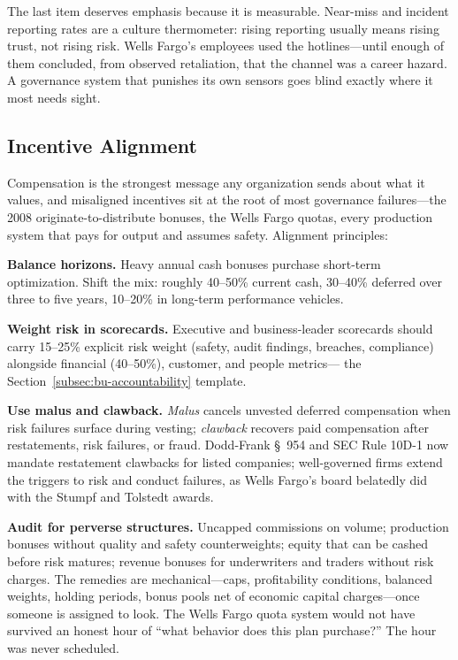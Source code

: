 \documentclass[11pt,openany]{book}
\begin{document}
The last item deserves emphasis because it is measurable. Near-miss and
incident reporting rates are a culture thermometer: rising reporting usually
means rising trust, not rising risk. Wells Fargo's employees used the
hotlines---until enough of them concluded, from observed retaliation, that
the channel was a career hazard. A governance system that punishes its own
sensors goes blind exactly where it most needs sight.

\subsection{Incentive Alignment}
\label{subsec:gov-incentives}

Compensation is the strongest message any organization sends about what it
values, and misaligned incentives sit at the root of most governance
failures---the 2008 originate-to-distribute bonuses, the Wells Fargo quotas,
every production system that pays for output and assumes safety. Alignment
principles:

\textbf{Balance horizons.} Heavy annual cash bonuses purchase short-term
optimization. Shift the mix: roughly 40--50\% current cash, 30--40\% deferred
over three to five years, 10--20\% in long-term performance vehicles.

\textbf{Weight risk in scorecards.} Executive and business-leader scorecards
should carry 15--25\% explicit risk weight (safety, audit findings, breaches,
compliance) alongside financial (40--50\%), customer, and people metrics---%
the Section~\ref{subsec:bu-accountability} template.

\textbf{Use malus and clawback.} \emph{Malus} cancels unvested deferred
compensation when risk failures surface during vesting; \emph{clawback}
recovers paid compensation after restatements, risk failures, or fraud.
Dodd-Frank \S~954 and SEC Rule 10D-1 now mandate restatement clawbacks for
listed companies; well-governed firms extend the triggers to risk and conduct
failures, as Wells Fargo's board belatedly did with the Stumpf and Tolstedt
awards.

\textbf{Audit for perverse structures.} Uncapped commissions on volume;
production bonuses without quality and safety counterweights; equity that can
be cashed before risk matures; revenue bonuses for underwriters and traders
without risk charges. The remedies are mechanical---caps, profitability
conditions, balanced weights, holding periods, bonus pools net of economic
capital charges---once someone is assigned to look. The Wells Fargo quota
system would not have survived an honest hour of ``what behavior does this
plan purchase?'' The hour was never scheduled.
\end{document}
